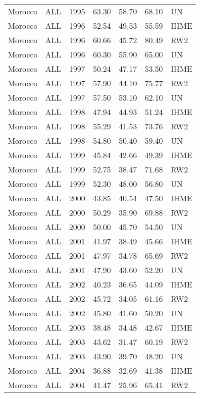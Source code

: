 \begin{longtable}{lllrrrl}
  Morocco & ALL & 1995 & 63.30 & 58.70 & 68.10 & UN \\ 
  Morocco & ALL & 1996 & 52.54 & 49.53 & 55.59 & IHME \\ 
  Morocco & ALL & 1996 & 60.66 & 45.72 & 80.49 & RW2 \\ 
  Morocco & ALL & 1996 & 60.30 & 55.90 & 65.00 & UN \\ 
  Morocco & ALL & 1997 & 50.24 & 47.17 & 53.50 & IHME \\ 
  Morocco & ALL & 1997 & 57.90 & 44.10 & 75.77 & RW2 \\ 
  Morocco & ALL & 1997 & 57.50 & 53.10 & 62.10 & UN \\ 
  Morocco & ALL & 1998 & 47.94 & 44.93 & 51.24 & IHME \\ 
  Morocco & ALL & 1998 & 55.29 & 41.53 & 73.76 & RW2 \\ 
  Morocco & ALL & 1998 & 54.80 & 50.40 & 59.40 & UN \\ 
  Morocco & ALL & 1999 & 45.84 & 42.66 & 49.39 & IHME \\ 
  Morocco & ALL & 1999 & 52.75 & 38.47 & 71.68 & RW2 \\ 
  Morocco & ALL & 1999 & 52.30 & 48.00 & 56.80 & UN \\ 
  Morocco & ALL & 2000 & 43.85 & 40.54 & 47.50 & IHME \\ 
  Morocco & ALL & 2000 & 50.29 & 35.90 & 69.88 & RW2 \\ 
  Morocco & ALL & 2000 & 50.00 & 45.70 & 54.50 & UN \\ 
  Morocco & ALL & 2001 & 41.97 & 38.49 & 45.66 & IHME \\ 
  Morocco & ALL & 2001 & 47.97 & 34.78 & 65.69 & RW2 \\ 
  Morocco & ALL & 2001 & 47.90 & 43.60 & 52.20 & UN \\ 
  Morocco & ALL & 2002 & 40.23 & 36.65 & 44.09 & IHME \\ 
  Morocco & ALL & 2002 & 45.72 & 34.05 & 61.16 & RW2 \\ 
  Morocco & ALL & 2002 & 45.80 & 41.60 & 50.20 & UN \\ 
  Morocco & ALL & 2003 & 38.48 & 34.48 & 42.67 & IHME \\ 
  Morocco & ALL & 2003 & 43.62 & 31.47 & 60.19 & RW2 \\ 
  Morocco & ALL & 2003 & 43.90 & 39.70 & 48.20 & UN \\ 
  Morocco & ALL & 2004 & 36.88 & 32.69 & 41.38 & IHME \\ 
  Morocco & ALL & 2004 & 41.47 & 25.96 & 65.41 & RW2 \\ 

\end{longtable}
